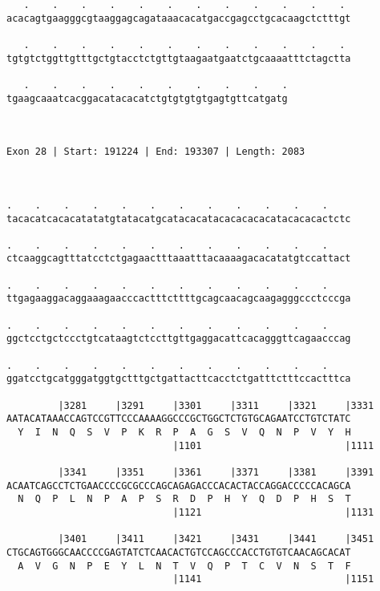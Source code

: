 \documentclass{article}
\begin{document}
\begin{Verbatim}
   .    .    .    .    .    .    .    .    .    .    .    . 
acacagtgaagggcgtaaggagcagataaacacatgaccgagcctgcacaagctctttgt
                                                            
   .    .    .    .    .    .    .    .    .    .    .    . 
tgtgtctggttgtttgctgtacctctgttgtaagaatgaatctgcaaaatttctagctta
                                                            
   .    .    .    .    .    .    .    .    .    .
tgaagcaaatcacggacatacacatctgtgtgtgtgagtgttcatgatg
                                                 
                                                 
 
Exon 28 | Start: 191224 | End: 193307 | Length: 2083



.    .    .    .    .    .    .    .    .    .    .    .    
tacacatcacacatatatgtatacatgcatacacatacacacacacatacacacactctc
                                                            
.    .    .    .    .    .    .    .    .    .    .    .    
ctcaaggcagtttatcctctgagaactttaaatttacaaaagacacatatgtccattact
                                                            
.    .    .    .    .    .    .    .    .    .    .    .    
ttgagaaggacaggaaagaacccactttcttttgcagcaacagcaagagggccctcccga
                                                            
.    .    .    .    .    .    .    .    .    .    .    .    
ggctcctgctccctgtcataagtctccttgttgaggacattcacagggttcagaacccag
                                                            
.    .    .    .    .    .    .    .    .    .    .    .    
ggatcctgcatgggatggtgctttgctgattacttcacctctgatttctttccactttca
                                                            
         |3281     |3291     |3301     |3311     |3321     |3331
AATACATAAACCAGTCCGTTCCCAAAAGGCCCGCTGGCTCTGTGCAGAATCCTGTCTATC
  Y  I  N  Q  S  V  P  K  R  P  A  G  S  V  Q  N  P  V  Y  H
                             |1101                         |1111
  
         |3341     |3351     |3361     |3371     |3381     |3391
ACAATCAGCCTCTGAACCCCGCGCCCAGCAGAGACCCACACTACCAGGACCCCCACAGCA
  N  Q  P  L  N  P  A  P  S  R  D  P  H  Y  Q  D  P  H  S  T
                             |1121                         |1131
  
         |3401     |3411     |3421     |3431     |3441     |3451
CTGCAGTGGGCAACCCCGAGTATCTCAACACTGTCCAGCCCACCTGTGTCAACAGCACAT
  A  V  G  N  P  E  Y  L  N  T  V  Q  P  T  C  V  N  S  T  F
                             |1141                         |1151
  

\end{Verbatim}
\end{document}
